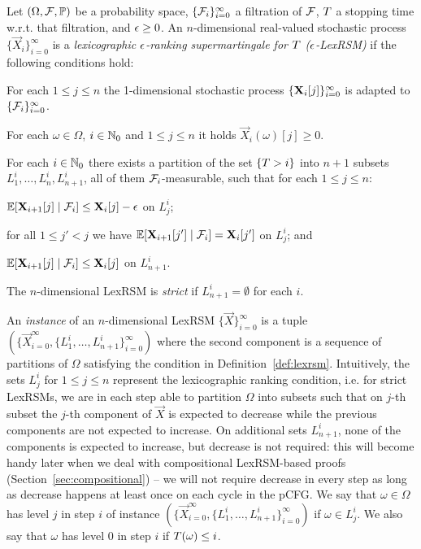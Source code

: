 \begin{definition}
\label{def:lexrsm}
Let $(\Omega,\mathcal{F},\mathbb{P})$ be a probability space, 
$\{\mathcal{F}_i\}_{i=0}^{\infty}$ a filtration of $\mathcal{F}$, $T$ a stopping 
time w.r.t. that filtration, and 
$\epsilon\geq 0$. 
An $n$-dimensional real-valued stochastic process 
$\{\vec{X}_{i}\}_{i=0}^{\infty}$ is a 
\emph{lexicographic $\epsilon$-ranking supermartingale for $T$ 
($\epsilon$-LexRSM)} if the 
following 
conditions hold:
\begin{compactenum}
\item For each $1\leq j \leq n$ the 1-dimensional stochastic process 
$\{\mathbf{X}_{i}[j]\}_{i=0}^{\infty}$ is adapted to 
$\{\mathcal{F}_i\}_{i=0}^{\infty}$.
\item For each $\omega \in \Omega$, $i\in \mathbb{N}_0$ and $1\leq j \leq n$ it holds 
$\vec{X}_i (\omega)[j]\geq {0}$. %
\item For each $i\in \mathbb{N}_0$ there exists a partition of the set $\{T>i\}$ into $n+1$ subsets $L^i_1,\dots,L^i_n,L^i_{n+1}$, all of them $\mathcal{F}_i$-measurable, such that for each $1\leq j \leq n$:
\begin{compactitem}
	\item $\mathbb{E}[\mathbf{X}_{i+1}[j]\mid 
	\mathcal{F}_i]\leq\mathbf{X}_{i}[j] - 
	\epsilon$ on $L_j^i$; 
	\item 
	 for all $1 \leq j' < j$ we have $\mathbb{E}[\mathbf{X}_{i+1}[j']\mid 
	 \mathcal{F}_i]=\mathbf{X}_{i}[j']$ on $L_{j}^i$; and
	\item $\mathbb{E}[\mathbf{X}_{i+1}[j]\mid 
	\mathcal{F}_i]\leq\mathbf{X}_{i}[j]$ on $L_{n+1}^i$. 
\end{compactitem}
\end{compactenum}
The $n$-dimensional LexRSM is \emph{strict} if $L^i_{n+1}=\emptyset$ for each $i$.
\end{definition}

An \emph{instance} of an $n$-dimensional LexRSM $\{\vec{X} \}_{i=0}^{\infty}$ is a tuple $(\{\vec{X}_{i=0}^{\infty},\{L_1^i,\dots,L_{n+1}^i\}_{i=0}^{\infty})$ where the second component is a sequence of partitions of $\Omega$ satisfying the condition in Definition~\ref{def:lexrsm}.
Intuitively, the sets $ L_j^{i}$ for $1\leq j \leq n$ represent the lexicographic ranking condition, i.e. for strict LexRSMs, we are in each step able to partition $\Omega$ into subsets such that on $j$-th subset the $j$-th component of $\vec{X}$ is expected to decrease while the previous components are not expected to increase. On additional sets $L_{n+1}^i$, none of the components is expected to increase, but decrease is not required: this will become handy later when we deal with compositional LexRSM-based proofs (Section~\ref{sec:compositional}) -- we will not require decrease in every step as long as decrease happens at least once on each cycle in the pCFG. We say that $\omega\in \Omega$ has level $j$ in step $i$ of instance $(\{\vec{X}_{i=0}^{\infty},\{L_1^i,\dots,L_{n+1}^i\}_{i=0}^{\infty})$ if $\omega\in L^i_j$. We also say that $\omega$ has level $0$ in step $i$ if $T(\omega)\leq i$.

